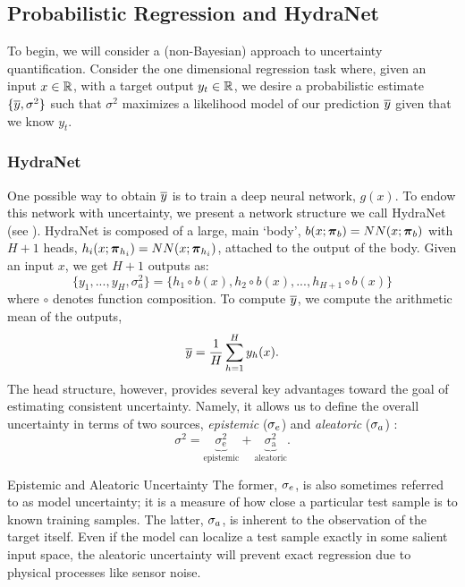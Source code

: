 \subsection{Probabilistic Regression and HydraNet}

To begin, we will consider a (non-Bayesian) approach to uncertainty quantification. Consider the one dimensional regression task where, given an input $x \in \mathbb{R}$, with a target output $y_t \in \mathbb{R}$, we desire a probabilistic estimate $\{\overline{y}, \sigma^2\}$
such that $\sigma^2$ maximizes a likelihood model of our prediction $\overline{y}$ given that we know $y_t$.
\subsubsection{HydraNet}
One possible way to obtain $\overline{y}$ is to train a deep neural network, $g(x)$. To endow this network with uncertainty, we present a network structure we call HydraNet (see ). HydraNet is composed of a large, main `body', $b(x; \boldsymbol{\mathbf{\pi}}_b) = NN(x; \boldsymbol{\mathbf{\pi}}_b)$ with $H+1$ heads, $h_i(x; \boldsymbol{\mathbf{\pi}}_{h_i}) = NN(x; \boldsymbol{\mathbf{\pi}}_{h_i})$, attached to the output of the body. Given an input $x$, we get $H+1$ outputs as:
\begin{equation}
	\{y_1, ..., y_H, \sigma^2_a\} = \{h_1 \circ b (x), h_2 \circ b (x), ..., h_{H+1} \circ b (x)\}
\end{equation}
where $\circ$ denotes function composition. To compute  $\overline{y}$, we compute the arithmetic mean of the outputs,
\begin{equation}
\label{eq:hn_1d_mean}
\overline{y} = \frac{1}{H}\sum_{h=1}^{H}y_h(x).
\end{equation} 
The head structure, however, provides several key advantages toward the goal of estimating consistent uncertainty. Namely, it allows us to define the overall uncertainty in terms of two sources, \textit{epistemic} ($\sigma_e$) and \textit{aleatoric} ($\sigma_a$) \citep{Kendall2017-vs}:
\begin{equation}
\label{eq:1d_hydranet_uncertainty}
\sigma^2 = \underbrace{\sigma^2_{\text{e}}}_{\text{epistemic}} + \underbrace{\sigma^2_{\text{a}}}_{\text{aleatoric}}.
\end{equation} 
\begin{remark}{Epistemic and Aleatoric Uncertainty}
	The former, $\sigma_e$, is also sometimes referred to as model uncertainty; it is a measure of how close a particular test sample is to known training samples. The latter, $\sigma_a$, is inherent to the observation of the target itself.  Even if the model can localize a test sample exactly in some salient input space, the aleatoric uncertainty will prevent exact regression due to physical processes like sensor noise.
\end{remark}

